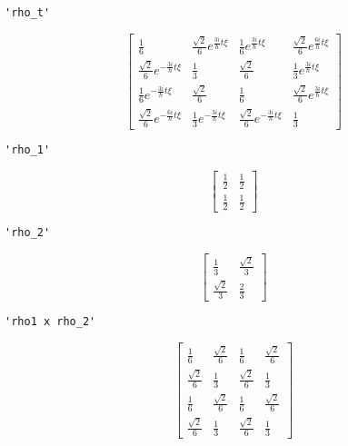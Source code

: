 \documentclass[11pt]{article}
\begin{document}
    
    
    \begin{verbatim}
'rho_t'
    \end{verbatim}

    
    $$\left[\begin{matrix}\frac{1}{6} & \frac{\sqrt{2}}{6} e^{\frac{3 i}{\hbar} t \xi} & \frac{1}{6} e^{\frac{3 i}{\hbar} t \xi} & \frac{\sqrt{2}}{6} e^{\frac{6 i}{\hbar} t \xi}\\\frac{\sqrt{2}}{6} e^{- \frac{3 i}{\hbar} t \xi} & \frac{1}{3} & \frac{\sqrt{2}}{6} & \frac{1}{3} e^{\frac{3 i}{\hbar} t \xi}\\\frac{1}{6} e^{- \frac{3 i}{\hbar} t \xi} & \frac{\sqrt{2}}{6} & \frac{1}{6} & \frac{\sqrt{2}}{6} e^{\frac{3 i}{\hbar} t \xi}\\\frac{\sqrt{2}}{6} e^{- \frac{6 i}{\hbar} t \xi} & \frac{1}{3} e^{- \frac{3 i}{\hbar} t \xi} & \frac{\sqrt{2}}{6} e^{- \frac{3 i}{\hbar} t \xi} & \frac{1}{3}\end{matrix}\right]$$

    
    
    \begin{verbatim}
'rho_1'
    \end{verbatim}

    
    $$\left[\begin{matrix}\frac{1}{2} & \frac{1}{2}\\\frac{1}{2} & \frac{1}{2}\end{matrix}\right]$$

    
    
    \begin{verbatim}
'rho_2'
    \end{verbatim}

    
    $$\left[\begin{matrix}\frac{1}{3} & \frac{\sqrt{2}}{3}\\\frac{\sqrt{2}}{3} & \frac{2}{3}\end{matrix}\right]$$

    
    
    \begin{verbatim}
'rho1 x rho_2'
    \end{verbatim}

    
    $$\left[\begin{matrix}\frac{1}{6} & \frac{\sqrt{2}}{6} & \frac{1}{6} & \frac{\sqrt{2}}{6}\\\frac{\sqrt{2}}{6} & \frac{1}{3} & \frac{\sqrt{2}}{6} & \frac{1}{3}\\\frac{1}{6} & \frac{\sqrt{2}}{6} & \frac{1}{6} & \frac{\sqrt{2}}{6}\\\frac{\sqrt{2}}{6} & \frac{1}{3} & \frac{\sqrt{2}}{6} & \frac{1}{3}\end{matrix}\right]$$
\end{document}
